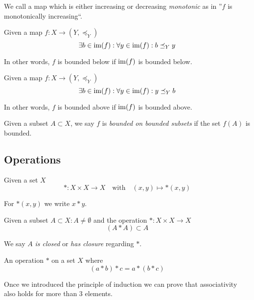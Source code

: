 \begin{remark}[Monotonic]
   We call a map which is either increasing or decreasing \textit{monotonic} as in ''\(f\) is monotonically increasing``.
\end{remark}

\begin{definition}
   Given a map \(f: X \to (Y, \preceq_Y)\)
   \[\exists b \in \operatorname{im}(f): \forall y \in \operatorname{im}(f): b \preceq_Y y\]
\end{definition}
\begin{remark}
   In other words, \(f\) is bounded below if \(\operatorname{im}(f)\) is bounded below.
\end{remark}

\begin{definition}
   Given a map \(f: X \to (Y, \preceq_Y)\)
   \[\exists b \in \operatorname{im}(f): \forall y \in \operatorname{im}(f): y \preceq_Y b\]
\end{definition}
\begin{remark}
   In other words, \(f\) is bounded above if \(\operatorname{im}(f)\) is bounded above.
\end{remark}
\begin{remark}
   Given a subset \(A \subset X\), we say \(f\) is \textit{bounded on bounded subsets} if the set \(f(A)\) is bounded.
\end{remark}

\subsection{Operations}
\begin{definition}[Operation]
   Given a set \(X\)
   \[\ast: X \times X \to X \quad\text{with}\quad (x, y) \mapsto \ast(x, y)\]
\end{definition}
\begin{remark}[Notation]
   For \(\ast(x, y)\) we write \(x \ast y\).
\end{remark}

\begin{definition}
   Given a subset \(A \subset X: A \neq \emptyset\) and the operation \(*: X \times X \to X\)
   \[(A \ast A) \subset A\]
\end{definition}
\begin{remark}
   We say \(A\) \emph{is closed} or \emph{has closure} regarding \(\ast\).
\end{remark}

\begin{definition}
   An operation \(\ast\) on a set \(X\) where
   \[(a \ast b) \ast c = a \ast (b \ast c)\]
\end{definition}
\begin{remark}
   Once we introduced the principle of induction we can prove that associativity also holds for more than 3 elements.
\end{remark}

